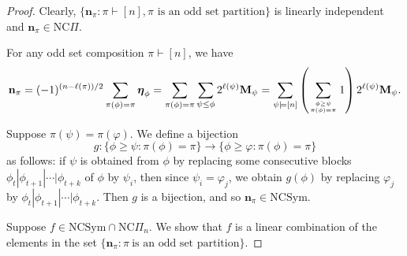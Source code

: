 \documentclass[11pt]{amsart}
\numberwithin{equation}{section}
\newcommand{\NCSym}{\mathrm{NCSym}}
\newcommand{\NCPeak}{\mathrm{NC}\Pi}
\newcommand{\boldeta}{{\boldsymbol{\eta}}}
\begin{document}
\begin{proof}
	Clearly, $\{\mathbf{n}_\pi: \pi\vdash[n], \pi\text{ is an odd set partition}\}$ is linearly independent and $\mathbf{n}_\pi\in\NCPeak$.
	
For any odd set composition $\pi\vdash[n]$, we have
	$$\mathbf{n}_\pi=(-1)^{(n-\ell(\pi))/2}\sum_{\pi(\phi)=\pi}\boldeta_\phi=\sum_{\pi(\phi)=\pi}\sum_{\psi\leq\phi}2^{\ell(\psi)}\mathbf{M}_\psi=\sum_{\psi\models [n]}\left(\sum_{\phi\geq\psi \atop \pi(\phi)=\pi}1\right)2^{\ell(\psi)}\mathbf{M}_\psi.$$ 
	
	Suppose $\pi(\psi)=\pi(\varphi)$. We define a bijection $$g:\{\phi\geq\psi:\pi(\phi)=\pi\}\to\{\phi\geq\varphi:\pi(\phi)=\pi\}$$ as follows: if $\psi$ is obtained from $\phi$ by replacing some consecutive blocks $\phi_t|\phi_{t+1}|\cdots|\phi_{t+k}$ of $\phi$ by $\psi_i$, then since $\psi_i=\varphi_j$, we obtain $g(\phi)$ by replacing $\varphi_j$ by $\phi_t|\phi_{t+1}|\cdots|\phi_{t+k}$. Then $g$ is a bijection, and so  $\mathbf{n}_\pi\in\NCSym$.
	
	Suppose $f\in \NCSym\cap\NCPeak_n$. We show that 
	$f$ is a linear combination of the elements in the set $\{\mathbf{n}_\pi: \pi~ \text{is an odd set partition}\}$. 
	

\end{proof}
\end{document}
